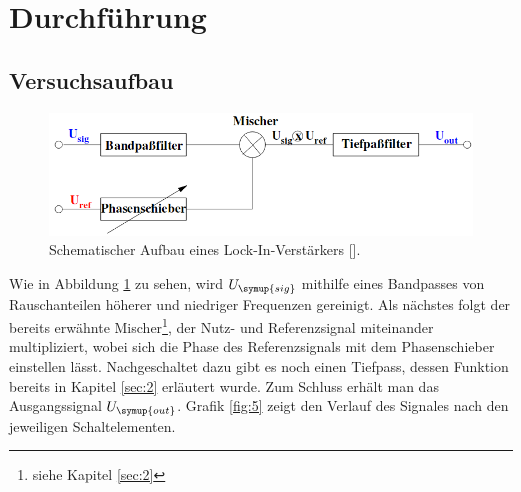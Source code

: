 \section{Durchführung}
\subsection{Versuchsaufbau}
\label{sec:3.1}
\begin{figure}
  \centering
  \includegraphics[scale=0.4]{aufbau.png}
  \caption{Schematischer Aufbau eines Lock-In-Verstärkers [\cite{anleitung}].}
  \label{fig:2}
\end{figure}
Wie in Abbildung \ref{fig:2} zu sehen, wird $U_{\symup{sig}}$ mithilfe eines Bandpasses
von Rauschanteilen höherer und niedriger Frequenzen gereinigt. Als nächstes folgt
der bereits erwähnte Mischer\footnote{siehe Kapitel \ref{sec:2}}, der Nutz- und
Referenzsignal miteinander multipliziert, wobei sich die Phase des Referenzsignals
mit dem Phasenschieber einstellen lässt. Nachgeschaltet dazu gibt es noch einen
Tiefpass, dessen Funktion bereits in Kapitel \ref{sec:2} erläutert wurde. Zum
Schluss erhält man das Ausgangssignal $U_ {\symup{out}}$. Grafik \ref{fig:5} zeigt den Verlauf
des Signales nach den jeweiligen Schaltelementen.
